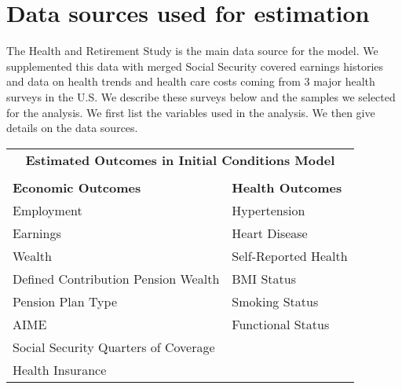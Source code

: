 \section{Data sources used for estimation}
The Health and Retirement Study is the main data source for the model. We supplemented this data with 
merged Social Security covered earnings histories and data on health trends and health care costs 
coming from 3 major health surveys in the U.S. We describe these surveys below and the samples we 
selected for the analysis. We first list the variables used in the analysis. We then give details on 
the data sources.

\begin{center}
\begin{tabular}{l l}
\multicolumn{2}{c}{\textbf{Estimated Outcomes in Initial Conditions Model}}\\
 & \\
\textbf{Economic Outcomes}	& \textbf{Health Outcomes}\\
Employment & Hypertension\\
Earnings & Heart Disease\\
Wealth & Self-Reported Health\\
Defined Contribution Pension Wealth	& BMI Status\\
Pension Plan Type	& Smoking Status\\
AIME & Functional Status\\
Social Security Quarters of Coverage & \\
Health Insurance & 
\end{tabular}\end{center}~\\~\\

